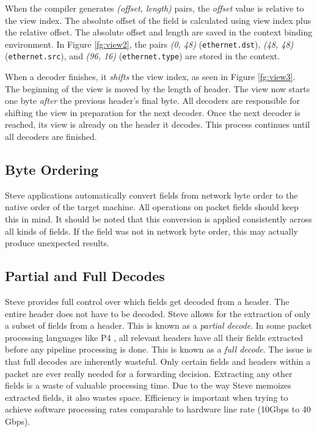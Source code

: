 When the compiler generates \textit{(offset, length)} pairs,
the \emph{offset} value is relative to the view index. The
absolute offset of the field is calculated using view index plus
the relative offset.
The absolute offset and length are saved in the context binding environment.
In Figure \ref{fg:view2}, the pairs \textit{(0, 48)} (\texttt{ethernet.dst}),
\textit{(48, 48)} (\texttt{ethernet.src}), and \textit{(96, 16)} 
(\texttt{ethernet.type}) are stored in the context.


When a decoder finishes, it \textit{shifts} the view index, as seen in Figure
\ref{fg:view3}. The beginning of the view is moved by the length of header.
The view now starts one byte \textit{after} the previous header's final byte. 
All decoders are responsible for shifting the view in
preparation for the next decoder. Once the next decoder is reached, its view is
already on the header it decodes.
This process continues until all decoders are finished.

\subsection{Byte Ordering}

Steve applications automatically convert fields from network byte order
to the native order of the target machine. All operations on packet fields should keep this in mind.
It should be noted that this conversion is applied consistently across all kinds of fields. If the field was not in network byte order, this may actually produce unexpected results.

\subsection{Partial and Full Decodes}

Steve provides full control over which fields get decoded
from a header. The entire header does not have to be decoded.
Steve allows for the extraction of only a subset of fields from a header. 
This is known as a \emph{partial decode}.
In some packet processing languages like P4 \cite{p4_spec, p4_spec2}, all
relevant headers have all their fields extracted before any pipeline processing
is done. 
This is known as a \emph{full decode}.
The issue is that full decodes are inherently wasteful.
Only certain fields and headers within a packet are ever really needed for a
forwarding decision.
Extracting any other fields is a waste of valuable processing time.
Due to the way Steve memoizes extracted fields, it also wastes space.
Efficiency is important when trying
to achieve software processing rates comparable to hardware line rate 
(10Gbps to 40 Gbps).

